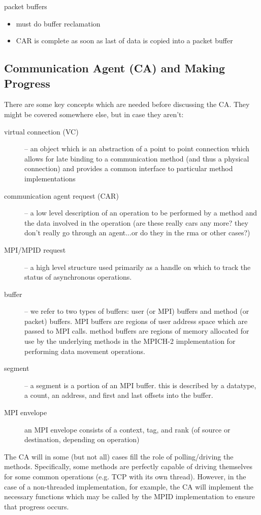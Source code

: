 \documentclass[11pt,letterpaper]{article}
\begin{document}
packet buffers
\begin{itemize}
\item must do buffer reclamation
\item CAR is complete as soon as last of data is copied into a packet buffer
\end{itemize}

%
%
\subsection{Communication Agent (CA) and Making Progress}

There are some key concepts which are needed before discussing the CA.  They
might be covered somewhere else, but in case they aren't:
\begin{description}
\item[virtual connection (VC)] -- an object which is an abstraction of a point
  to point connection which allows for late binding to a communication method
  (and thus a physical connection) and provides a common interface to
  particular method implementations
\item[communication agent request (CAR)] -- a low level description of an
  operation to be performed by a method and the data involved in the operation
  (are these really cars any more?  they don't really go through an agent...or
  do they in the rma or other cases?)
\item[MPI/MPID request] -- a high level structure used primarily as a handle on
  which to track the status of asynchronous operations.
\item[buffer] -- we refer to two types of buffers: user (or MPI) buffers and
  method (or packet) buffers.  MPI buffers are regions of user address space
  which are passed to MPI calls.  method buffers are regions of memory
  allocated for use by the underlying methods in the MPICH-2 implementation for
  performing data movement operations.
\item[segment] -- a segment is a portion of an MPI buffer.  this is described
  by a datatype, a count, an address, and first and last offsets into the
  buffer.
\item[MPI envelope] an MPI envelope consists of a context, tag, and rank (of
  source or destination, depending on operation)
\end{description}

The CA will in some (but not all) cases fill the role of polling/driving the
methods.  Specifically, some methods are perfectly capable of driving
themselves for some common operations (e.g. TCP with its own thread).  However,
in the case of a non-threaded implementation, for example, the CA will
implement the necessary functions which may be called by the MPID
implementation to ensure that progress occurs.
\end{document}
